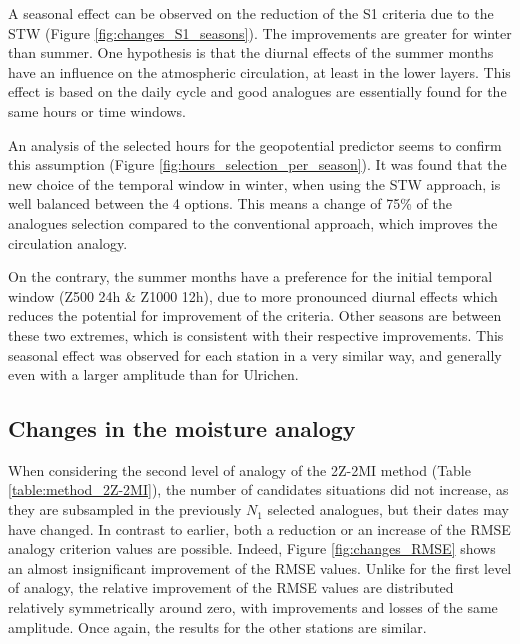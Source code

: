 \documentclass[hess]{copernicus}
\begin{document}
A seasonal effect can be observed on the reduction of the S1 criteria due to the STW (Figure \ref{fig:changes_S1_seasons}). The improvements are greater for winter than summer. One hypothesis is that the diurnal effects of the summer months have an influence on the atmospheric circulation, at least in the lower layers. This effect is based on the daily cycle and good analogues are essentially found for the same hours or time windows.

An analysis of the selected hours for the geopotential predictor seems to confirm this assumption (Figure \ref{fig:hours_selection_per_season}). It was found that the new choice of the temporal window in winter, when using the STW approach, is well balanced between the 4 options. This means a change of 75\% of the analogues selection compared to the conventional approach, which improves the circulation analogy.

On the contrary, the summer months have a preference for the initial temporal window (Z500 24h \& Z1000 12h), due to more pronounced diurnal effects which reduces the potential for improvement of the criteria. Other seasons are between these two extremes, which is consistent with their respective improvements. This seasonal effect was observed for each station in a very similar way, and generally even with a larger amplitude than for Ulrichen.


\subsection{Changes in the moisture analogy}

When considering the second level of analogy of the 2Z-2MI method (Table \ref{table:method_2Z-2MI}), the number of candidates situations did not increase, as they are subsampled in the previously $N_{1}$ selected analogues, but their dates may have changed. In contrast to earlier, both a reduction or an increase of the RMSE analogy criterion values are possible. Indeed, Figure \ref{fig:changes_RMSE} shows an almost insignificant improvement of the RMSE values. Unlike for the first level of analogy, the relative improvement of the RMSE values are distributed relatively symmetrically around zero, with improvements and losses of the same amplitude. Once again, the results for the other stations are similar.
\end{document}
